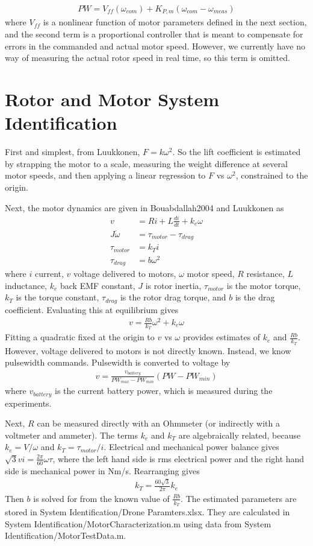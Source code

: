 \documentclass[10pt]{article}
\begin{document}
	\begin{align*}
		PW = V_{ff}(\omega_{com}) + K_{P,m}(\omega_{com} - \omega_{meas})
	\end{align*}
	where $V_{ff}$ is a nonlinear function of motor parameters defined in the next section, and the second term is a proportional controller that is meant to compensate for errors in the commanded and actual motor speed. However, we currently have no way of measuring the actual rotor speed in real time, so this term is omitted.

	
	\section{Rotor and Motor System Identification}
	First and simplest, from Luukkonen, $F = k\omega^2$. So the lift coefficient is estimated by strapping the motor to a scale, measuring the weight difference at several motor speeds, and then applying a linear regression to $F$ vs $\omega^2$, constrained to the origin.
	
	Next, the motor dynamics are given in Bouabdallah2004 and Luukkonen as
	\begin{align*}
		v &= R i + L \frac{di}{dt} + k_e\omega \\
		J\dot{\omega} &= \tau_{motor} -\tau_{drag}\\
		\tau_{motor} &= k_T i \\
		\tau_{drag} &= b \omega^2
	\end{align*}
	where $i$ current, $v$ voltage delivered to motors, $\omega$ motor speed, $R$ resistance, $L$ inductance, $k_e$ back EMF constant, $J$ is rotor inertia, $\tau_{motor}$ is the motor torque, $k_T$ is the torque constant, $\tau_{drag}$ is the rotor drag torque, and $b$ is the drag coefficient.  Evaluating this at equilibrium gives
	\begin{align*}
		v = \frac{Rb}{k_T} \omega^2 + k_e \omega
	\end{align*}
	Fitting a quadratic fixed at the origin to $v$ vs $\omega$ provides estimates of $k_e$ and $ \frac{Rb}{k_T}$. However, voltage delivered to motors is not directly known. Instead, we know pulsewidth commands. Pulsewidth is converted to voltage by
	\begin{align*}
		v = \frac{v_{battery}}{PW_{max}-PW_{min}}(PW-PW_{min})
	\end{align*}
	where $v_{battery}$ is the current battery power, which is measured during the experiments. 
	
	Next, $R$ can be measured directly with an Ohmmeter (or indirectly with a voltmeter and ammeter). The terms $k_e$ and $k_T$ are algebraically related, because $k_e = V/\omega$ and $k_T = \tau_{motor}/i$. Electrical and mechanical power balance gives $\sqrt{3}vi = \frac{2\pi}{60}\omega \tau$, where the left hand side is rms electrical power and the right hand side is mechanical power in Nm/s. Rearranging gives
	\begin{align*}
		k_T = \frac{60\sqrt{3}}{2\pi}k_e
	\end{align*} 
	Then $b$ is solved for from the known value of $\frac{Rb}{k_T}$. The estimated parameters are stored in System Identification/Drone Paramters.xlsx. They are calculated in System Identification/MotorCharacterization.m using data from System Identification/MotorTestData.m.
	
\end{document}

